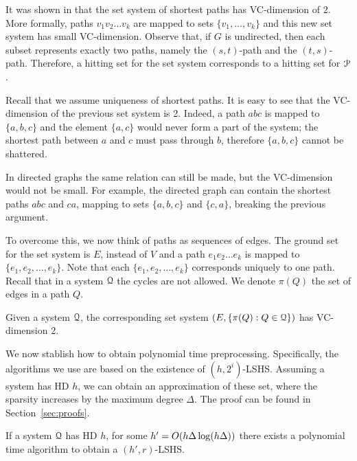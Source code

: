 It was shown in \cite{highway2013} that the set system of shortest paths has VC-dimension of $2$.
More formally, paths $v_1v_2\ldots v_k$ are mapped to sets $\{v_1,\ldots,v_k\}$ and this new set system has small VC-dimension.
Observe that, if $G$ is undirected, then each subset represents exactly two paths, namely the $(s,t)$-path and the $(t,s)$-path.
Therefore, a hitting set for the set system corresponds to a hitting set for $\mathcal{P}$.

Recall that we assume uniqueness of shortest paths.
It is easy to see that the VC-dimension of the previous set system is 2.
Indeed, a path $abc$ is mapped to $\{a,b,c\}$ and the element $\{a,c\}$ would never form a part of the system; the shortest path between $a$ and $c$ must pass through $b$, therefore $\{a,b,c\}$ cannot be shattered.

In directed graphs the same relation can still be made, but the VC-dimension would not be small.
For example, the directed graph can contain the shortest paths $abc$ and $ca$, mapping to sets $\{a,b,c\}$ and $\{c,a\}$, breaking the previous argument.

To overcome this, we now think of paths as sequences of edges.
The ground set for the set system is $E$, instead of $V$ and a path $e_1e_2\ldots e_k$ is mapped to $\{e_1,e_2,\ldots,e_k\}$.
Note that each $\{e_1,e_2,\ldots,e_k\}$ corresponds uniquely to one path.
Recall that in a system $\mathcal{Q}$ the cycles are not allowed.
We denote $\pi(Q)$ the set of edges in a path $Q$.

\begin{proposition}
Given a system $\mathcal{Q}$, the corresponding set system $(E,\{\pi(Q):Q\in\mathcal{Q}\})$ has VC-dimension 2.
\end{proposition}

We now stablish how to obtain polynomial time preprocessing.
Specifically, the algorithms we use are based on the existence of $(h,2^i)$-LSHS.
Assuming a system has HD $h$, we can obtain an approximation of these set, where the sparsity increases by the maximum degree $\Delta$.
The proof can be found in Section~\ref{sec:proofs}.

\begin{proposition}\label{prop:poly_lshs}
If a system $\mathcal{Q}$ has HD $h$, for some $h'=O(h\Delta\log(h\Delta))$ there exists a polynomial time algorithm to obtain a $(h',r)$-LSHS.	
\end{proposition}

